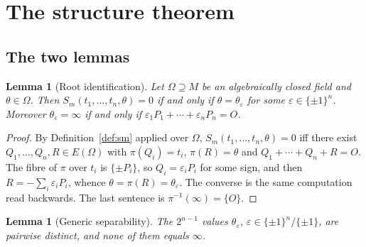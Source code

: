 \documentclass[11pt,a4paper]{article}
\theoremstyle{plain}
\newtheorem{lemma}[theorem]{Lemma}
\theoremstyle{definition}
\newcommand{\eps}{\varepsilon}
\begin{document}
\section{The structure theorem}\label{sec:main}

\subsection{The two lemmas}

\begin{lemma}[Root identification]\label{lem:roots}
Let $\Omega \supseteq M$ be an algebraically closed field and $\theta \in \Omega$.
Then $S_m(t_1,\dots,t_n,\theta) = 0$ if and only if $\theta = \theta_{\eps}$ for
some $\eps \in \{\pm1\}^n$. Moreover $\theta_{\eps} = \infty$ if and only if
$\eps_1 P_1 + \cdots + \eps_n P_n = O$.
\end{lemma}

\begin{proof}
By Definition~\ref{def:sm} applied over $\Omega$, $S_m(t_1,\dots,t_n,\theta) = 0$
iff there exist $Q_1,\dots,Q_n, R \in E(\Omega)$ with $\pi(Q_i) = t_i$,
$\pi(R) = \theta$ and $Q_1 + \cdots + Q_n + R = O$. The fibre of $\pi$ over $t_i$
is $\{\pm P_i\}$, so $Q_i = \eps_i P_i$ for some sign, and then
$R = -\sum_i \eps_i P_i$, whence $\theta = \pi(R) = \theta_{\eps}$. The converse
is the same computation read backwards. The last sentence is
$\pi^{-1}(\infty) = \{O\}$.
\end{proof}

\begin{lemma}[Generic separability]\label{lem:sep}
The $2^{n-1}$ values $\theta_{\eps}$, $\eps \in \{\pm1\}^n/\{\pm1\}$, are pairwise
distinct, and none of them equals $\infty$.
\end{lemma}
\end{document}
